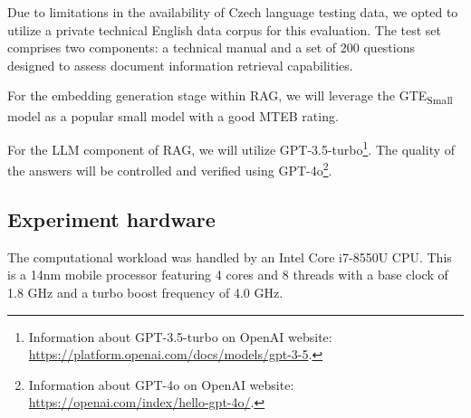 Due to limitations in the availability of Czech language testing data, we opted to utilize a private technical English data corpus for this evaluation.
The test set comprises two components: a technical manual and a set of 200 questions designed to assess document information retrieval capabilities.

For the embedding generation stage within \ac{RAG}, we will leverage the GTE\textsubscript{Small} model as a popular small model with a good \ac{MTEB} rating.

For the \ac{LLM} component of \ac{RAG}, we will utilize GPT-3.5-turbo\footnote{\label{footnote:gpt-3.5-turbo}Information about GPT-3.5-turbo on OpenAI website: \url{https://platform.openai.com/docs/models/gpt-3-5}.}.
The quality of the answers will be controlled and verified using GPT-4o\footnote{\label{footnote:gpt-4o}Information about GPT-4o on OpenAI website: \url{https://openai.com/index/hello-gpt-4o/}.}.


\subsection{Experiment hardware}
The computational workload was handled by an Intel Core i7-8550U CPU.
This is a 14nm mobile processor featuring 4 cores and 8 threads with a base clock of 1.8 GHz and a turbo boost frequency of 4.0 GHz.



